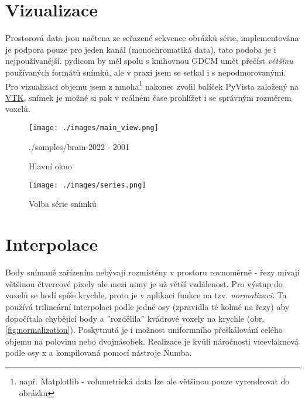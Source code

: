 \documentclass[czech]{pyt-report}
\begin{document}
\section{Vizualizace}
\label{sec:vizualizace}
Prostorová data jsou načtena ze seřazené sekvence obrázků série, implementována je podpora pouze pro jeden kanál (monochromatiká data), tato podoba je i nejpoužívanější. pydicom by měl spolu s knihovnou GDCM umět přečíst \emph{většinu} používaných formátů snímků\cite{bib:pydicom-formats}, ale v praxi jsem se setkal i s nepodmorovanými. Pro vizualizaci objemu jsem z mnoha\footnote{např. Matplotlib - volumetrická data lze ale většinou pouze vyrendrovat do obrázku} nakonec zvolil balíček PyVista\cite{bib:pyvista-volumes} založený na \href{https://vtk.org/}{VTK}, snímek je možné si pak v reálném čase prohlížet i se správným rozměrem voxelů.

\begin{figure}[h]
  \centering\leavevmode
  \texttt{[image: ./images/main\_view.png]}\vskip-0.5cm
  \medskip
  \caption{Hlavní okno}
  \smallskip
  \tiny ./samples/brain-2022 - 2001
  \label{fig:main_view}
\end{figure}

\begin{figure}[h]
  \centering\leavevmode
  \texttt{[image: ./images/series.png]}\vskip-0.5cm
  \medskip
  \caption{Volba série snímků}
  \label{fig:series}
\end{figure}

\section{Interpolace}
\label{sec:interpolace}
Body snímané zařízením nebývají rozmístěny v prostoru rovnoměrně - řezy mívají většinou čtvercové pixely ale mezi nimy je už větší vzdálenost. Pro výstup do voxelů se hodí spíše krychle, proto je v aplikaci funkce na tzv. \emph{normalizaci}. Ta používá trilineární interpolaci\cite{bib:wiki-trilinear_interpolation} podle jedné osy (zpravidla té kolmé na řezy) aby dopočítala chybějící body a ''rozdělila'' kvádrové voxely na krychle (obr. \ref{fig:normalization}). Poskytnutá je i možnost uniformního přeškálování celého objemu na polovinu nebo dvojnásobek. Realizace je kvůli náročnosti vícevláknová podle osy x a kompilovaná pomocí nástroje Numba\cite{bib:numba}.
\end{document}
